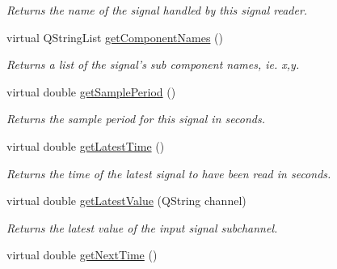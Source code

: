 \begin{DoxyCompactItemize}
\begin{DoxyCompactList}\small\item\em Returns the name of the signal handled by this signal reader. \end{DoxyCompactList}\item 
\hypertarget{class_picto_1_1_signal_state_a1afdf94e0e668061e3440073658ce333}{virtual Q\-String\-List \hyperlink{class_picto_1_1_signal_state_a1afdf94e0e668061e3440073658ce333}{get\-Component\-Names} ()}\label{class_picto_1_1_signal_state_a1afdf94e0e668061e3440073658ce333}

\begin{DoxyCompactList}\small\item\em Returns a list of the signal's sub component names, ie. x,y. \end{DoxyCompactList}\item 
\hypertarget{class_picto_1_1_signal_state_a2c18cb0d84eb870b11294656b0cbd85b}{virtual double \hyperlink{class_picto_1_1_signal_state_a2c18cb0d84eb870b11294656b0cbd85b}{get\-Sample\-Period} ()}\label{class_picto_1_1_signal_state_a2c18cb0d84eb870b11294656b0cbd85b}

\begin{DoxyCompactList}\small\item\em Returns the sample period for this signal in seconds. \end{DoxyCompactList}\item 
\hypertarget{class_picto_1_1_signal_state_a575c54d1a9cf4e346f4e9314faeaada9}{virtual double \hyperlink{class_picto_1_1_signal_state_a575c54d1a9cf4e346f4e9314faeaada9}{get\-Latest\-Time} ()}\label{class_picto_1_1_signal_state_a575c54d1a9cf4e346f4e9314faeaada9}

\begin{DoxyCompactList}\small\item\em Returns the time of the latest signal to have been read in seconds. \end{DoxyCompactList}\item 
\hypertarget{class_picto_1_1_signal_state_af428e67c518b83e612e0a2c7943f18e0}{virtual double \hyperlink{class_picto_1_1_signal_state_af428e67c518b83e612e0a2c7943f18e0}{get\-Latest\-Value} (Q\-String channel)}\label{class_picto_1_1_signal_state_af428e67c518b83e612e0a2c7943f18e0}

\begin{DoxyCompactList}\small\item\em Returns the latest value of the input signal subchannel. \end{DoxyCompactList}\item 
\hypertarget{class_picto_1_1_signal_state_af48b47952b87622d3333cafe99dcf1b7}{virtual double \hyperlink{class_picto_1_1_signal_state_af48b47952b87622d3333cafe99dcf1b7}{get\-Next\-Time} ()}\label{class_picto_1_1_signal_state_af48b47952b87622d3333cafe99dcf1b7}


\end{DoxyCompactItemize}
